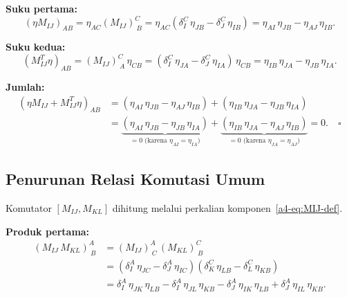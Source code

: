 \vspace{0.5em}
\noindent \textbf{Suku pertama:}
\begin{equation}
    (\eta M_{IJ})_{AB} = \eta_{AC}(M_{IJ})^C_{\ B}
    = \eta_{AC}(\delta^C_I\,\eta_{JB} - \delta^C_J\,\eta_{IB})
    = \eta_{AI}\,\eta_{JB} - \eta_{AJ}\,\eta_{IB}.
\end{equation}

\vspace{0.5em}
\noindent \textbf{Suku kedua:}
\begin{equation}
    (M_{IJ}^T\eta)_{AB} = (M_{IJ})^C_{\ A}\,\eta_{CB}
    = (\delta^C_I\,\eta_{JA} - \delta^C_J\,\eta_{IA})\,\eta_{CB}
    = \eta_{IB}\,\eta_{JA} - \eta_{JB}\,\eta_{IA}.
\end{equation}

\vspace{0.5em}
\noindent \textbf{Jumlah:}
\begin{align}
    (\eta M_{IJ} + M_{IJ}^T\eta)_{AB}
    &= (\eta_{AI}\,\eta_{JB} - \eta_{AJ}\,\eta_{IB})
    + (\eta_{IB}\,\eta_{JA} - \eta_{JB}\,\eta_{IA}) \nonumber\\[4pt]
    &= \underbrace{(\eta_{AI}\,\eta_{JB} - \eta_{JB}\,\eta_{IA})}_{\displaystyle = 0\text{ (karena }\eta_{AI} = \eta_{IA}\text{)}}
    + \underbrace{(\eta_{IB}\,\eta_{JA} - \eta_{AJ}\,\eta_{IB})}_{\displaystyle = 0\text{ (karena }\eta_{JA} = \eta_{AJ}\text{)}} = 0.\quad\square
\end{align}

\subsection{Penurunan Relasi Komutasi Umum}

Komutator $[M_{IJ}, M_{KL}]$ dihitung melalui perkalian komponen~\eqref{a4-eq:MIJ-def}.

\vspace{0.5em}
\noindent \textbf{Produk pertama:}
\begin{align}
    (M_{IJ}\,M_{KL})^A_{\ B}
    &= (M_{IJ})^A_{\ C}\,(M_{KL})^C_{\ B} \nonumber\\[4pt]
    &= (\delta^A_I\,\eta_{JC} - \delta^A_J\,\eta_{IC})
    (\delta^C_K\,\eta_{LB} - \delta^C_L\,\eta_{KB}) \nonumber\\[4pt]
    &= \delta^A_I\,\eta_{JK}\,\eta_{LB}
    - \delta^A_I\,\eta_{JL}\,\eta_{KB}
    - \delta^A_J\,\eta_{IK}\,\eta_{LB}
    + \delta^A_J\,\eta_{IL}\,\eta_{KB}. \label{a4-eq:prod1}
\end{align}

